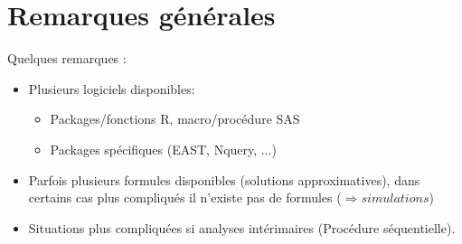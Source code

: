 \section{Remarques générales}
Quelques remarques : 
\begin{itemize}
    \item Plusieurs logiciels disponibles:
    \begin{itemize}
        \item Packages/fonctions R, macro/procédure SAS
        \item Packages spécifiques (EAST, Nquery, ...)
    \end{itemize}
\item Parfois plusieurs formules disponibles (solutions approximatives), dans certains cas plus compliqués il n’existe pas de formules ($\Rightarrow simulations$)
 \item Situations plus compliquées si analyses intérimaires (Procédure séquentielle).
\end{itemize}


